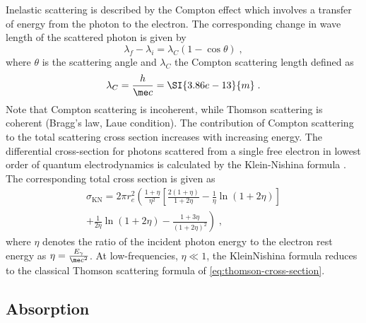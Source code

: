 \documentclass[
twoside,
openright,
titlepage,
numbers=noenddot,
headinclude,
fleqn,
a4paper,
footinclude=true,
cleardoublepage=empty,
abstractoff,
BCOR=5mm,
paper=a4,
fontsize=11pt,
british,ngerman,american,
]{scrreprt}
\begin{document}
Inelastic scattering is described by the Compton effect which involves
a transfer of energy from the photon to the electron.  The
corresponding change in wave length of the scattered photon is given
by
\begin{equation}
  \label{eq:compton-scattering}
  \lambda_f-\lambda_i=\lambda_C(1-\cos\theta)\;,
\end{equation}
where $\theta$ is the scattering angle and $\lambda_C$ 
the Compton scattering length defined as
\begin{equation}
  \label{eq:compton-length}
  \lambda_C=\frac{h}{\me c} = \SI{3.86e-13}{m} \;.
\end{equation}
Note that Compton scattering is incoherent, while Thomson scattering is
coherent (Bragg's law, Laue condition).  
The contribution of Compton
scattering to the total scattering cross section increases with
increasing energy.  The differential cross-section for photons
scattered from a single free electron in lowest order of quantum
electrodynamics is calculated by the Klein-Nishina formula
\cite{KleinNishina1929}.  The corresponding total cross section is
given as
\begin{equation}
  \label{eq:klein-nishina-cross-section}
  \begin{split}
      \sigma_{\mathrm{KN}} = 2\pi r_e^2\left(
    \frac{1+\eta}{\eta^2}
    \left[ \frac{2(1+\eta)}{1+2\eta} 
      -\frac{1}{\eta}\ln(1+2\eta) \right] \right.
    \\\left.+\frac{1}{2\eta}\ln(1+2\eta)-\frac{1+3\eta}{(1+2\eta)^2}
    \right) \;,
  \end{split}
\end{equation}
where $\eta$ denotes the ratio of the incident photon energy to the
electron rest energy as $\eta=\frac{E_\gamma}{\me c^2}$.  At
low-frequencies, $\eta\ll 1$, the Klein\hyph Nishina formula reduces
to the classical Thomson scattering formula of
\cref{eq:thomson-cross-section}.


\subsection{Absorption}
\label{sec:absorption}
\end{document}
